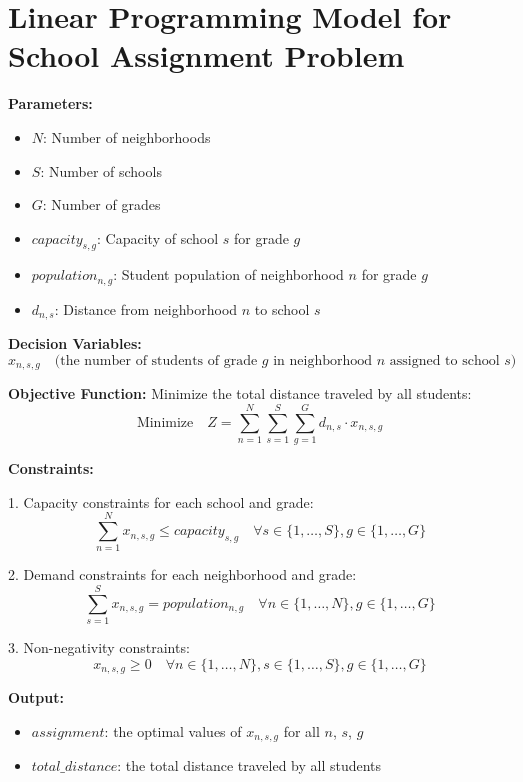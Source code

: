 \documentclass{article}
\begin{document}
\section*{Linear Programming Model for School Assignment Problem}

\textbf{Parameters:}
\begin{itemize}
    \item $N$: Number of neighborhoods
    \item $S$: Number of schools
    \item $G$: Number of grades
    \item $capacity_{s,g}$: Capacity of school $s$ for grade $g$
    \item $population_{n,g}$: Student population of neighborhood $n$ for grade $g$
    \item $d_{n,s}$: Distance from neighborhood $n$ to school $s$
\end{itemize}

\textbf{Decision Variables:}
\[
x_{n,s,g} \quad \text{(the number of students of grade } g \text{ in neighborhood } n \text{ assigned to school } s\text{)}
\]

\textbf{Objective Function:}
Minimize the total distance traveled by all students:
\[
\text{Minimize} \quad Z = \sum_{n=1}^{N} \sum_{s=1}^{S} \sum_{g=1}^{G} d_{n,s} \cdot x_{n,s,g}
\]

\textbf{Constraints:}

1. Capacity constraints for each school and grade:
\[
\sum_{n=1}^{N} x_{n,s,g} \leq capacity_{s,g} \quad \forall s \in \{1, \ldots, S\}, g \in \{1, \ldots, G\}
\]

2. Demand constraints for each neighborhood and grade:
\[
\sum_{s=1}^{S} x_{n,s,g} = population_{n,g} \quad \forall n \in \{1, \ldots, N\}, g \in \{1, \ldots, G\}
\]

3. Non-negativity constraints:
\[
x_{n,s,g} \geq 0 \quad \forall n \in \{1, \ldots, N\}, s \in \{1, \ldots, S\}, g \in \{1, \ldots, G\}
\]

\textbf{Output:}
\begin{itemize}
    \item $assignment$: the optimal values of $x_{n,s,g}$ for all $n$, $s$, $g$
    \item $total\_distance$: the total distance traveled by all students
\end{itemize}
\end{document}
